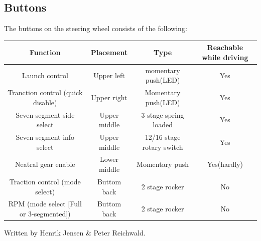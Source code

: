 \subsection*{Buttons}
The buttons on the steering wheel consists of the following:
\begin{center}
  \begin{tabular}{| c | c | c | c |}
    \hline
    Function & Placement & Type & Reachable while driving  \\ \hline
    Launch control & Upper left & momentary push(LED) & Yes\\ \hline
    Tranction control (quick disable) & Upper right & Momentary push(LED) & Yes\\ \hline
    Seven segment side select & Upper middle & 3 stage spring loaded & Yes\\ \hline
    Seven segment info select & Upper middle & 12/16 stage rotary switch & Yes\\ \hline
    Neatral gear enable & Lower middle & Momentary push & Yes(hardly)\\ \hline
    Traction control (mode select) & Buttom back & 2 stage rocker & No\\ \hline
    RPM (mode select [Full or 3-segmented]) & Buttom back & 2 stage rocker & No\\ \hline
    
  \end{tabular}
\end{center}
Written by Henrik Jensen \& Peter Reichwald. 